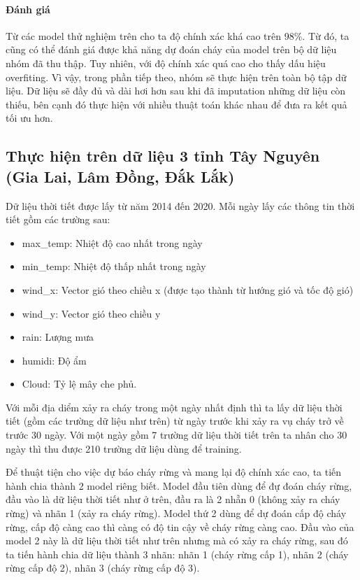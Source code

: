 \documentclass{article}
\begin{document}
\paragraph{Đánh giá}
Từ các model thử nghiệm trên cho ta độ chính xác khá cao trên 98\%. Từ đó, ta cũng có thể đánh giá được khả năng dự đoán cháy của model trên bộ dữ liệu nhóm đã thu thập. Tuy nhiên, với độ chính xác quá cao cho thấy dấu hiệu overfiting. Vì vậy, trong phần tiếp theo, nhóm sẽ thực hiện trên toàn bộ tập dữ liệu. Dữ liệu sẽ đầy đủ và dài hơi hơn sau khi đã imputation những dữ liệu còn thiếu, bên cạnh đó thực hiện với nhiều thuật toán khác nhau để đưa ra kết quả tối ưu hơn.
\subsection{Thực hiện trên dữ liệu 3 tỉnh Tây Nguyên (Gia Lai, Lâm Đồng, Đắk Lắk)}

Dữ liệu thời tiết được lấy từ năm 2014 đến 2020. Mỗi ngày lấy các thông tin thời tiết gồm các trường sau:

\begin{itemize}
	\item max\_temp: Nhiệt độ cao nhất trong ngày
	\item min\_temp: Nhiệt độ thấp nhất trong ngày
	\item wind\_x: Vector gió theo chiều x (được tạo thành từ hướng gió và tốc độ gió)
	\item wind\_y: Vector gió theo chiều y
	\item rain: Lượng mưa
	\item humidi: Độ ẩm
	\item Cloud: Tỷ lệ mây che phủ.
\end{itemize}

Với mỗi địa diểm xảy ra cháy trong một ngày nhất định thì ta lấy dữ liệu thời tiết (gồm các trường dữ liệu như trên) từ ngày trước khi xảy ra vụ cháy trở về trước 30 ngày. Với một ngày gồm 7 trường dữ liệu thời tiết trên ta nhân cho 30 ngày thì thu được 210 trường dữ liệu dùng để training.

Để thuật tiện cho việc dự báo cháy rừng và mang lại độ chính xác cao, ta tiến hành chia thành 2 model riêng biết. Model đầu tiên dùng để đự đoán cháy rừng, đầu vào là dữ liệu thời tiết như ở trên, đầu ra là 2 nhẵn 0 (không xảy ra cháy rừng) và nhãn 1 (xảy ra cháy rừng). Model thứ 2 dùng để dự đoán cấp độ cháy rừng, cấp độ càng cao thì càng có độ tin cậy về cháy rừng càng cao. Đầu vào của model 2 này là dữ liệu thời tiết như trên nhưng mà có xảy ra cháy rừng, sau đó ta tiến hành chia dữ liệu thành 3 nhãn: nhãn 1 (cháy rừng cấp 1), nhãn 2 (cháy rừng cấp độ 2), nhãn 3 (cháy rừng cấp độ 3).
\end{document}
